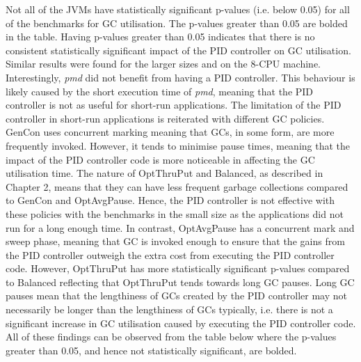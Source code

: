 Not all of the JVMs have statistically significant p-values (i.e. below
0.05) for all of the benchmarks for GC utilisation. The p-values greater
than 0.05 are bolded in the table. Having p-values greater than 0.05
indicates that there is no consistent statistically significant impact of
the PID controller on GC utilisation. Similar results were found for the
larger sizes and on the 8-CPU machine. Interestingly, \emph{pmd} did
not benefit from having a PID controller. This behaviour is likely caused by the
short execution time of \emph{pmd}, meaning that the PID controller is
not as useful for short-run applications.
\newline\newline
The limitation of the PID controller in short-run applications is
reiterated with different GC policies. GenCon uses concurrent marking
meaning that GCs, in some form, are more frequently invoked. However, it
tends to minimise pause times, meaning that the impact of the PID
controller code is more noticeable in affecting the GC utilisation time.
\newline\newline
The nature of OptThruPut and Balanced, as described in Chapter 2, means
that they can have less frequent garbage collections compared to GenCon
and OptAvgPause. Hence, the PID controller is not effective with these
policies with the benchmarks in the small size as the applications did
not run for a long enough time. In contrast, OptAvgPause has a
concurrent mark and sweep phase, meaning that GC is invoked enough to
ensure that the gains from the PID controller outweigh the extra cost
from executing the PID controller code. However, OptThruPut has more
statistically significant p-values compared to Balanced reflecting that
OptThruPut tends towards long GC pauses. Long GC pauses mean that the
lengthiness of GCs created by the PID controller may not necessarily be
longer than the lengthiness of GCs typically, i.e. there is not a
significant increase in GC utilisation caused by executing the PID
controller code. All of these findings can be observed from the table
below where the p-values greater than 0.05, and hence not statistically
significant, are bolded.
